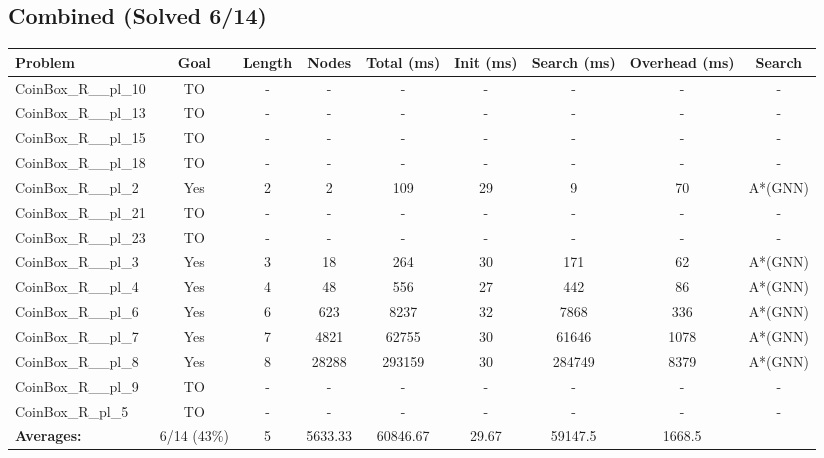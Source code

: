 \documentclass{article}
\begin{document}
\subsection*{Combined (Solved 6/14)}
\begin{tabular}{lcccccccc}
\toprule
Problem & Goal & Length & Nodes & Total (ms) & Init (ms) & Search (ms) & Overhead (ms) & Search \\
\midrule
CoinBox\_R\_\_pl\_10 & TO & - & - & - & - & - & - & - \\
CoinBox\_R\_\_pl\_13 & TO & - & - & - & - & - & - & - \\
CoinBox\_R\_\_pl\_15 & TO & - & - & - & - & - & - & - \\
CoinBox\_R\_\_pl\_18 & TO & - & - & - & - & - & - & - \\
CoinBox\_R\_\_pl\_2 & Yes & 2 & 2 & 109 & 29 & 9 & 70 & A*(GNN) \\
CoinBox\_R\_\_pl\_21 & TO & - & - & - & - & - & - & - \\
CoinBox\_R\_\_pl\_23 & TO & - & - & - & - & - & - & - \\
CoinBox\_R\_\_pl\_3 & Yes & 3 & 18 & 264 & 30 & 171 & 62 & A*(GNN) \\
CoinBox\_R\_\_pl\_4 & Yes & 4 & 48 & 556 & 27 & 442 & 86 & A*(GNN) \\
CoinBox\_R\_\_pl\_6 & Yes & 6 & 623 & 8237 & 32 & 7868 & 336 & A*(GNN) \\
CoinBox\_R\_\_pl\_7 & Yes & 7 & 4821 & 62755 & 30 & 61646 & 1078 & A*(GNN) \\
CoinBox\_R\_\_pl\_8 & Yes & 8 & 28288 & 293159 & 30 & 284749 & 8379 & A*(GNN) \\
CoinBox\_R\_\_pl\_9 & TO & - & - & - & - & - & - & - \\
CoinBox\_R\_pl\_5 & TO & - & - & - & - & - & - & - \\
\textbf{Averages:} & 6/14 (43\%) & 5 & 5633.33 & 60846.67 & 29.67 & 59147.5 & 1668.5 & \\
\bottomrule
\end{tabular}
\\[0.7cm]
\end{document}
